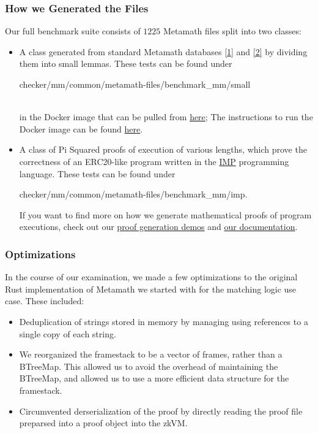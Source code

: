 \documentclass{article}
\theoremstyle{plain}
\theoremstyle{definition}
\begin{document}
\subsubsection{How we Generated the Files}
Our full benchmark suite consists of $1225$ Metamath files split into two classes:
\begin{itemize}
\item A class generated from standard Metamath databases \href{https://github.com/metamath/set.mm/blob/develop/demo0.mm}{[1]} and \href{https://github.com/metamath/set.mm/blob/develop/hol.mm}{[2]} by dividing them into small lemmas. These tests can be found under\\
\centerline{checker/mm/common/metamath-files/benchmark_mm/small}\\ 
in the Docker image that can be pulled from \href{https://github.com/pi-squared-inc/zk-benchmark/pkgs/container/pi2-zk-mm-checkers}{here}; The instructions to run the Docker image can be found \href{https://github.com/pi-squared-inc/zk-benchmark/pkgs/container/pi2-zk-mm-checkers#instructions}{here}.
\item A class of Pi Squared proofs of execution of various lengths, which prove the correctness of an ERC20-like program written in the \href{https://en.wikipedia.org/wiki/IMP_(programming_language)}{IMP} programming language. These tests can be found under\\
\centerline{checker/mm/common/metamath-files/benchmark_mm/imp.}

If you want to find more on how we generate mathematical proofs of program executions, check out our \href{https://github.com/Pi-Squared-Inc/devcon-2024/tree/main/demos#generating-metamath-proofs-for-arbitrary-programs}{proof generation demos} and \href{https://docs.pi2.network/}{our documentation}.
\end{itemize}
\subsubsection{Optimizations}

In the course of our examination, we made a few optimizations to the original Rust implementation of Metamath we started with for the matching logic use case. These included:

\begin{itemize}
    \item Deduplication of strings stored in memory by managing using references to a single copy of each string.
    \item We reorganized the framestack to be a vector of frames, rather than a BTreeMap. This allowed us to avoid the overhead of maintaining the BTreeMap, and allowed us to use a more efficient data structure for the framestack.
    \item Circumvented derserialization of the proof by directly reading the proof file preparsed into a proof object into the zkVM.
\end{itemize}
\end{document}
